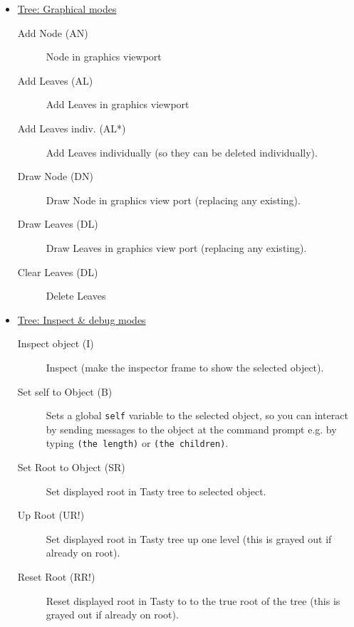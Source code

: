 \documentclass [11pt]{book}
\begin{document}
\begin{itemize}

\item 
\underline{Tree: Graphical modes}

\begin{description}

\item [Add Node (AN)]
Node in graphics viewport

\item [Add Leaves (AL)]
Add Leaves in graphics viewport

\item [Add Leaves indiv. (AL*)]
Add Leaves individually (so they can be deleted individually).

\item [Draw Node (DN)]
Draw Node in graphics view port (replacing any existing).

\item [Draw Leaves (DL)]
Draw Leaves in graphics view port (replacing any existing).

\item [Clear Leaves (DL)]
Delete Leaves

\end{description}



\item 
\underline{Tree: Inspect \& debug modes}

\begin{description}

\item [Inspect object (I)]
Inspect (make the inspector frame to show the selected object).

\item [Set self to Object (B)]
Sets a global \texttt{self} variable to the selected object, so you can interact by sending messages to the object at the command prompt e.g. by typing \texttt{(the length)} or \texttt{(the children)}.

\item [Set Root to Object (SR)]
Set displayed root in Tasty tree to selected object.

\item [Up Root (UR!)]
Set displayed root in Tasty tree up one level (this is grayed out if already on root).

\item [Reset Root (RR!)]
Reset displayed root in Tasty to to the true root of the tree (this is grayed out if already on root).


\end{description}
\end{itemize}
\end{document}
